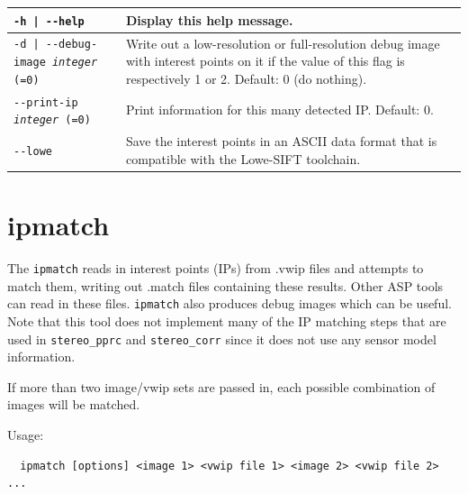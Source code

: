 \begin{longtable}{|l|p{9.5cm}|}
\texttt{-h | -\/-help   } & Display this help message.\\ \hline
\texttt{-d | -\/-debug-image  \textit{integer} (=0) } & Write out a low-resolution or full-resolution debug image with interest points on it if the value of this flag is respectively 1 or 2. Default: 0 (do nothing).\\ \hline
\texttt{-\/-print-ip \textit{integer} (=0) } & Print information for this many detected IP. Default: 0.\\ \hline
\texttt{-\/-lowe  } & Save the interest points in an ASCII data format that is compatible with the Lowe-SIFT toolchain.\\ \hline
\end{longtable}

\clearpage


\section{ipmatch}
\label{ipmatch}

The \texttt{ipmatch} reads in interest points (IPs) from .vwip files and attempts to match them,
writing out .match files containing these results.  Other ASP tools can read in these files.
\texttt{ipmatch} also produces debug images which can be useful.  Note that this tool does not
implement many of the IP matching steps that are used in \texttt{stereo\_pprc} and \texttt{stereo\_corr}
since it does not use any sensor model information.

If more than two image/vwip sets are passed in, each possible combination of images will be matched.

Usage:
\begin{verbatim}
  ipmatch [options] <image 1> <vwip file 1> <image 2> <vwip file 2> ...
\end{verbatim}

